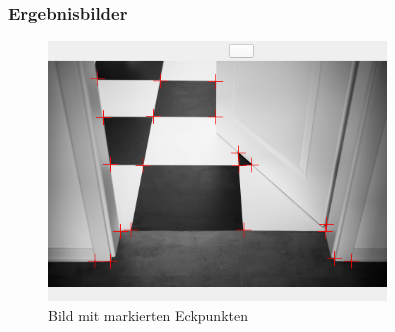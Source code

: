 \documentclass[12pt]{article}
\begin{document}
\subsubsection*{Ergebnisbilder}
\begin{figure}[H]
  \centering
  \includegraphics[width=0.8\textwidth, keepaspectratio]{harris_corner_detektor.png}\\
  Bild mit markierten Eckpunkten
\end{figure}
\end{document}
